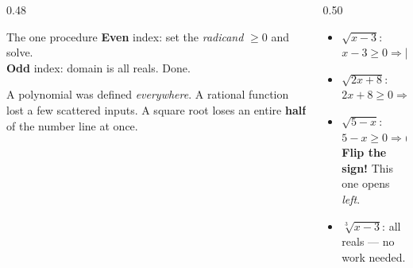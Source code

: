 \documentclass[aspectratio=169, 11pt]{beamer}
\begin{document}
\begin{frame}[t, plain]
  \begin{columns}[T]
    \begin{column}{0.48\textwidth}
      \begin{block}{The one procedure}
        \textbf{Even} index: set the \emph{radicand} $\ge 0$ and solve. \\[3pt]
        \textbf{Odd} index: domain is all reals. Done.
      \end{block}
      \vspace{4pt}
      {\footnotesize A polynomial was defined \emph{everywhere}. A rational function lost a few
      scattered inputs. A square root loses an entire \textbf{half} of the number line at once.}
    \end{column}
    \begin{column}{0.50\textwidth}
      \begin{itemize}\setlength{\itemsep}{5pt}
        \item $\sqrt{x-3}$: \; $x-3\ge0 \Rightarrow [3,\infty)$
        \item $\sqrt{2x+8}$: \; $2x+8\ge0 \Rightarrow [-4,\infty)$
        \item $\sqrt{5-x}$: \; $5-x\ge0 \Rightarrow (-\infty,5]$ \\
              {\footnotesize \textbf{Flip the sign!} This one opens \emph{left}.}
        \item $\sqrt[3]{x-3}$: \; all reals --- no work needed.
      \end{itemize}
    \end{column}
  \end{columns}
\end{frame}
\end{document}
